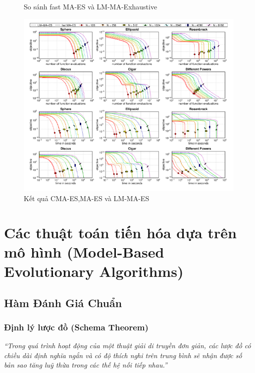 \documentclass{book}
\begin{document}
\begin{itemize}
\begin{figure}[H]
        \caption{So sánh fast MA-ES và LM-MA-Exhaustive}
        \label{fig:LM-MA-ES_fast-MA-ES}
    \end{figure}
    \begin{figure}[H]
        \centering
        \includegraphics[width=\textwidth]{images/LM-MA-ES_2.png}
        \caption{Kết quả CMA-ES,MA-ES và LM-MA-ES}
        \label{fig:LM-MA-ES_2}
    \end{figure}
\end{itemize}
\chapter{Các thuật toán tiến hóa dựa trên mô hình (Model-Based Evolutionary Algorithms)}
    \section{Hàm Đánh Giá Chuẩn}
    
        \subsection{Định lý lược đồ (Schema Theorem)}
        
        \textit{“Trong quá trình hoạt động của một thuật giải di truyền đơn giản, các lược đồ có chiều dài định nghĩa ngắn và có độ thích nghi trên trung bình sẽ nhận được số bản sao tăng luỹ thừa trong các thế hệ nối tiếp nhau.”}
        
\end{document}
